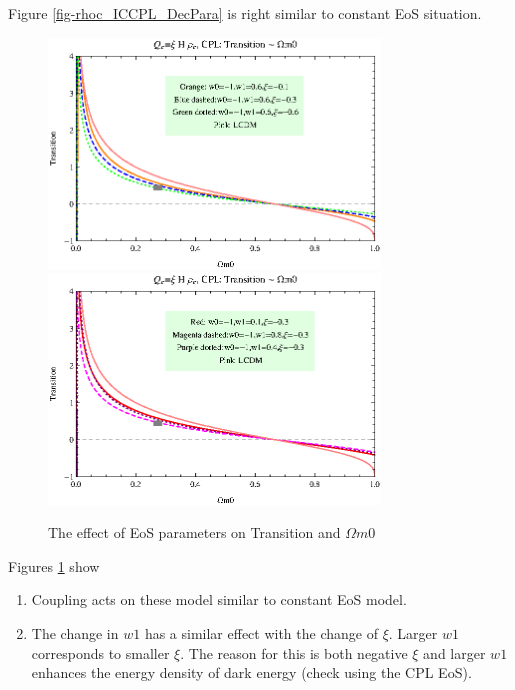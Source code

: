 \documentclass[12pt,a4paper]{article}
\begin{document}
Figure \ref{fig-rhoc_ICCPL_DecPara} is right similar to constant EoS situation.


\begin{figure}
\centering
\includegraphics[width=250pt]{rhoc_ICCPL_TransVSOmegam01.eps}
\includegraphics[width=250pt]{rhoc_ICCPL_TransVSOmegam02.eps}
\caption{The effect of EoS parameters on Transition and $\Omega m0$}\label{fig-rhoc_ICCPL_TransVSOmegam0}
\end{figure}

Figures \ref{fig-rhoc_ICCPL_TransVSOmegam0} show 
\begin{enumerate}
\item
Coupling acts on these model similar to constant EoS model.
\item
The change in $w1$ has a similar effect with the change of $\xi$. Larger $w1$ corresponds to smaller $\xi$. The reason for this is both negative $\xi$ and larger $w1$ enhances the energy density of dark energy (check using the CPL EoS).
\end{enumerate}
\end{document}
